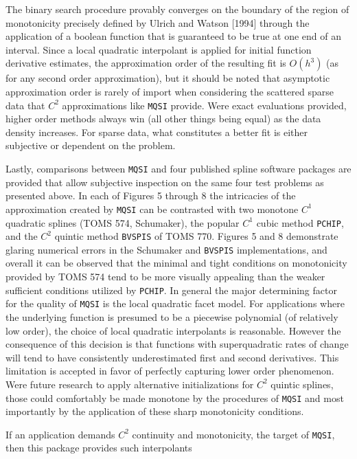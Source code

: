 \beginred

The binary search procedure provably converges on the boundary of the
region of monotonicity precisely defined by Ulrich and Watson [1994]
through the application of a boolean function that is guaranteed to be
true at one end of an interval. Since a local quadratic interpolant is
applied for initial function derivative estimates, the approximation
order of the resulting fit is $O(h^3)$ (as for any second order
approximation), but it should be noted that asymptotic approximation
order is rarely of import when considering the scattered sparse data
that $C^2$ approximations like {\tt MQSI} provide. Were exact
evaluations provided, higher order methods always win \textRed (all
other things being equal) as the data density increases. For sparse
data, what constitutes a better fit is either subjective or dependent
on the problem.

Lastly, comparisons between {\tt MQSI} and four published spline
software packages are provided that allow subjective inspection on the
same four test problems as presented above. In each of Figures 5
through 8 the intricacies of the approximation created by {\tt MQSI}
can be contrasted with two monotone $C^1$ quadratic splines (TOMS 574,
Schumaker), the popular $C^1$ cubic method {\tt PCHIP}, and the $C^2$
quintic method {\tt BVSPIS} of TOMS 770. Figures 5 and 8 demonstrate
glaring numerical errors in the Schumaker and {\tt BVSPIS}
implementations, and overall it can be observed that the minimal and
tight conditions on monotonicity provided by TOMS 574 tend to be more
visually appealing than the weaker sufficient conditions utilized by
{\tt PCHIP}. In general the major determining factor for the quality
of {\tt MQSI} is the local quadratic facet model. For applications
where the underlying function is presumed to be a piecewise polynomial
(of relatively low order), the choice of local quadratic interpolants
is reasonable. However the consequence of this decision is that
functions with superquadratic rates of change will tend to have
consistently underestimated first and second derivatives. This
limitation is accepted in favor of perfectly capturing lower order
phenomenon. Were future research to apply alternative initializations
for $C^2$ quintic splines, those could comfortably be made monotone by
the procedures of {\tt MQSI} and most importantly by the application
of these sharp monotonicity conditions.

\endred

If an application demands $C^2$ continuity and monotonicity, the
target of {\tt MQSI}, then this package  provides such
interpolants 


